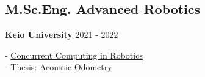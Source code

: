\subsection{M.Sc.Eng. Advanced Robotics}

\textbf{Keio University} \hfill 
{\footnotesize 2021 - 2022} \\
{
\raggedright
-
\href{https://www.linkedin.com/in/andreu-gimenez/overlay/education/733808829/multiple-media-viewer/?treasuryMediaId=1635488056423}{Concurrent
    Computing in Robotics} \\
- Thesis: \href{https://github.com/AcousticOdometry/AO}{Acoustic Odometry}
\\
}